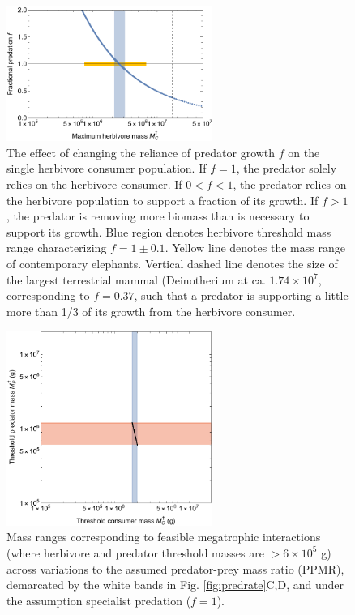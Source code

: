 \documentclass[]{rsos}%
\begin{document}
\begin{figure}
  \centering
  \includegraphics[width=0.6\textwidth]{fig_maxpreyvar.pdf}
  \caption{
	  The effect of changing the reliance of predator growth $f$ on the single herbivore consumer population. If $f=1$, the predator solely relies on the herbivore consumer. If $0<f<1$, the predator relies on the herbivore population to support a fraction of its growth. If $f>1$, the predator is removing more biomass than is necessary to support its growth.
	  Blue region denotes herbivore threshold mass range characterizing $f=1 \pm 0.1$.
	  Yellow line denotes the mass range of contemporary elephants.
	  Vertical dashed line denotes the size of the largest terrestrial mammal (Deinotherium at ca. $1.74\times 10^7$, corresponding to $f=0.37$, such that a predator is supporting a little more than 1/3 of its growth from the herbivore consumer.
  }
  \label{fig:maxpreyvar}
\end{figure}

\begin{figure}
  \centering
  \includegraphics[width=0.6\textwidth]{fig_megamammal.pdf}
  \caption{
    Mass ranges corresponding to feasible megatrophic interactions (where herbivore and predator threshold masses are $> 6\times10^5$ g) across variations to the assumed predator-prey mass ratio (PPMR), demarcated by the white bands in Fig. \ref{fig:predrate}C,D, and under the assumption specialist predation ($f=1$). 
  }
  \label{fig:megamammal}
\end{figure}
\end{document}
